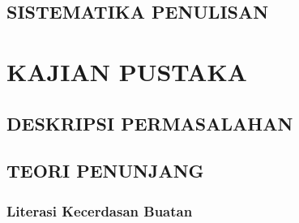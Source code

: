 \documentclass[12pt,a4paper,oneside,openany]{report}
\begin{document}
\section{SISTEMATIKA PENULISAN}
\label{sec:sistematika-penulisan}

\chapter{KAJIAN PUSTAKA}
\label{chap:bab2}


\section{DESKRIPSI PERMASALAHAN}
\label{sec:deskripsi-permasalahan}

\section{TEORI PENUNJANG}
\label{sec:teori-penunjang}

\subsection{Literasi Kecerdasan Buatan}
\label{subsec:literasi-ai}
\end{document}
